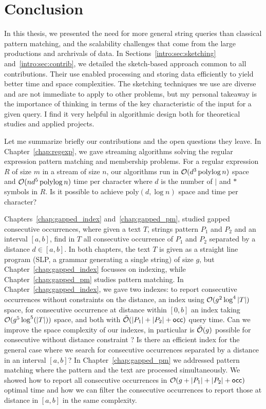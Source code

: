 \clearemptydoublepage
{}
\chapter*{Conclusion}
In this thesis, we presented the need for more general string queries than classical pattern matching, and the scalability challenges that come from the large productions and archrivals of data.
%
In Sections~\ref*{intro:sec:sketching} and~\ref*{intro:sec:contrib}, we detailed the sketch-based approach common to all contributions. Their use enabled processing and storing data efficiently to yield better time and space complexities.
%
The sketching techniques we use are diverse and are not immediate to apply to other problems, but my personal takeaway is the importance of thinking in terms of the key characteristic of the input for a given query. I find it very helpful in algorithmic design both for theoretical studies and applied projects.


Let me summarize briefly our contributions and the open questions they leave. 
In Chapter~\ref{chap:regexp}, we gave streaming algorithms solving the regular expression pattern matching and membership problems. For a regular expression $R$ of size $m$ in a stream of size $n$, our algorithms run in $\mathcal{O}(d^3 \operatorname{polylog} n)$ space and $\mathcal{O}(nd^5\operatorname{polylog} n)$ time per character where $d$ is the number of $|$ and $\ast$ symbols in $R$. Is it possible to achieve $\mathrm{poly}(d,\log n)$ space and time per character?

Chapters~\ref{chap:gapped_index} and~\ref{chap:gapped_pm}, studied gapped consecutive occurrences, where given a text $T$, strings pattern $P_1$ and $P_2$ and an interval $[a,b]$, find in $T$ all consecutive occurrence of $P_1$ and $P_2$ separated by a distance $d \in [a,b]$. In both chapters, the text $T$ is given as a straight line program (SLP, a grammar generating a single string) of size $g$, but Chapter~\ref{chap:gapped_index} focusses on indexing, while Chapter~\ref{chap:gapped_pm} studies pattern matching. In Chapter~\ref{chap:gapped_index}, we gave two indexes: to report consecutive occurrences without constraints on the distance, an index using $\mathcal{O}(g^2\log^4|T|)$ space, for consecutive occurrence at distance within $[0,b]$ an index taking $\mathcal{O} (g^5\log^5(|T|))$ space, and both with $\tilde{\mathcal{O}}(|P_1|+|P_2|+\mathsf{occ})$ query time. 
%
Can we improve the space complexity of our indexes, in particular is $\tilde{\mathcal{O}}(g)$ possible for consecutive without distance constraint ? Is there an efficient index for the general case where we search for consecutive occurrences separated by a distance in an interval $[a,b]$?
%
In Chapter~\ref{chap:gapped_pm} we addressed pattern matching where the pattern and the text are processed simultaneously. We showed how to report all consecutive occurrences in $\mathcal{O}(g+|P_1|+|P_2|+\mathsf{occ})$ optimal time and how we can filter the consecutive occurrences to report those at distance in $[a,b]$ in the same complexity.



